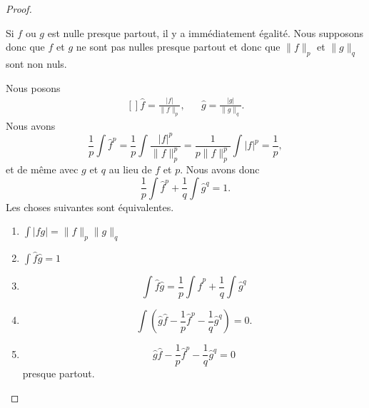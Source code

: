 \begin{proof}
\begin{subproof}
		Si \( f\) ou \( g\) est nulle presque partout, il y a immédiatement égalité. Nous supposons donc que \( f\) et \( g\) ne sont pas nulles presque partout et donc que \( \| f \|_p\) et \( \| g \|_q\) sont non nuls.
		\begin{subproof}
			Nous posons
			\begin{equation}
				\begin{aligned}[]
					\hat f=\frac{ | f | }{ \| f \|_p }, &  & \hat g=\frac{ | g | }{ \| g \|_q }.
				\end{aligned}
			\end{equation}
			Nous avons
			\begin{equation}
				\frac{1}{ p }\int\hat f^p=\frac{1}{ p }\int\frac{ | f |^p }{ \| f \|_p^p }=\frac{1}{ p\| f \|_p^p }\int| f |^p=\frac{1}{ p },
			\end{equation}
			et de même avec \( g\) et \( q\) au lieu de \( f\) et \( p\). Nous avons donc
			\begin{equation}
				\frac{1}{ p }\int\hat f^p+\frac{1}{ q }\int\hat g^q=1.
			\end{equation}
			Les choses suivantes sont équivalentes.
			\begin{enumerate}
				\item
				      \( \int | fg |=\| f \|_p\| g \|_q\)
				\item
				      \( \int\hat f\hat g=1\)
				\item
				      \begin{equation}
					      \int\hat f\hat g=\frac{1}{ p }\int \hat f^p+\frac{1}{ q }\int\hat g^q
				      \end{equation}
				\item
				      \begin{equation}
					      \int\left( \hat g\hat f-\frac{1}{ p }\hat f^p-\frac{1}{ q }\hat g^q \right)=0.
				      \end{equation}
				\item
				      \begin{equation}
					      \hat g\hat f-\frac{1}{ p }\hat f^p-\frac{1}{ q }\hat g^q=0
				      \end{equation}
				      presque partout.


\end{enumerate}
\end{subproof}
\end{subproof}
\end{proof}
